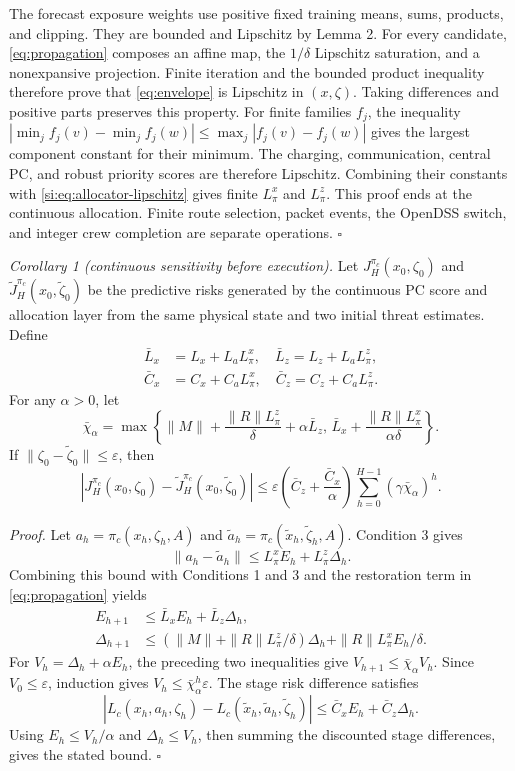 The forecast exposure weights use positive fixed training means, sums, products,
and clipping.  They are bounded and Lipschitz by Lemma 2.
For every candidate, \eqref{eq:propagation} composes an affine map, the
$1/\delta$ Lipschitz saturation, and a nonexpansive projection.
Finite iteration and the bounded product inequality therefore prove that
\eqref{eq:envelope} is Lipschitz in $(x,\zeta)$.
Taking differences and positive parts preserves this property.
For finite families $f_j$, the inequality
$|\min_j f_j(v)-\min_j f_j(w)|\le\max_j|f_j(v)-f_j(w)|$
gives the largest component constant for their minimum.
The charging, communication, central PC, and robust priority scores are
therefore Lipschitz.
Combining their constants with \eqref{si:eq:allocator-lipschitz} gives finite
$L_{\pi}^x$ and $L_{\pi}^z$.  This proof ends at the continuous allocation.
Finite route selection, packet events, the OpenDSS switch, and integer crew
completion are separate operations.  \hfill $\square$

\textit{Corollary 1 (continuous sensitivity before execution).}  Let
$J_H^{\pi_c}(x_0,\zeta_0)$ and
$\tilde J_H^{\pi_c}(x_0,\tilde\zeta_0)$ be the predictive risks generated by
the continuous PC score and allocation layer from the same physical state and
two initial threat estimates.  Define
\begin{align}
\bar L_x&=L_x+L_aL_{\pi}^x,\quad
\bar L_z=L_z+L_aL_{\pi}^{z},\\
\bar C_x&=C_x+C_aL_{\pi}^x,\quad
\bar C_z=C_z+C_aL_{\pi}^{z}.
\end{align}
For any $\alpha>0$, let
\begin{equation}
\bar\chi_{\alpha}=
\max\left\{\|M\|+\frac{\|R\|L_{\pi}^{z}}{\delta}+\alpha\bar L_z,\,
\bar L_x+\frac{\|R\|L_{\pi}^{x}}{\alpha\delta}\right\}.
\end{equation}
If $\|\zeta_0-\tilde\zeta_0\|\le\varepsilon$, then
\begin{equation}
|J_H^{\pi_c}(x_0,\zeta_0)-\tilde J_H^{\pi_c}(x_0,\tilde\zeta_0)|
\le
\varepsilon\left(\bar C_z+\frac{\bar C_x}{\alpha}\right)
\sum_{h=0}^{H-1}(\gamma\bar\chi_{\alpha})^h .
\end{equation}

\textit{Proof.}  Let $a_h=\pi_c(x_h,\zeta_h,A)$ and
$\tilde a_h=\pi_c(\tilde x_h,\tilde\zeta_h,A)$.  Condition 3 gives
\[
\|a_h-\tilde a_h\|\le L_{\pi}^xE_h+L_{\pi}^{z}\Delta_h .
\]
Combining this bound with Conditions 1 and 3 and the restoration term in
\eqref{eq:propagation} yields
\begin{align}
E_{h+1}&\le \bar L_xE_h+\bar L_z\Delta_h,\\
\Delta_{h+1}&\le
(\|M\|+\|R\|L_{\pi}^{z}/\delta)\Delta_h
+\|R\|L_{\pi}^{x}E_h/\delta .
\end{align}
For $V_h=\Delta_h+\alpha E_h$, the preceding two inequalities give
$V_{h+1}\le\bar\chi_{\alpha}V_h$.  Since $V_0\le\varepsilon$, induction gives
$V_h\le\bar\chi_{\alpha}^h\varepsilon$.  The stage risk difference satisfies
\[
|L_c(x_h,a_h,\zeta_h)-L_c(\tilde x_h,\tilde a_h,\tilde\zeta_h)|
\le \bar C_xE_h+\bar C_z\Delta_h .
\]
Using $E_h\le V_h/\alpha$ and $\Delta_h\le V_h$, then summing the discounted
stage differences, gives the stated bound.  \hfill $\square$
